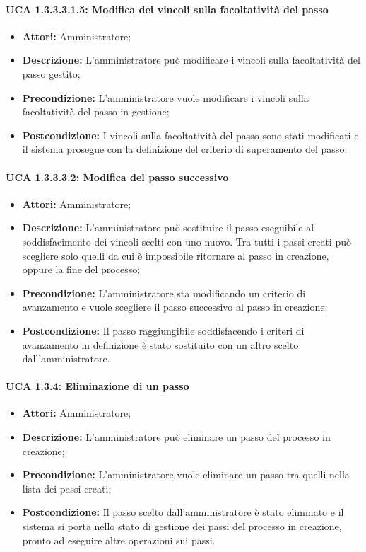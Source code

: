 \paragraph{UCA 1.3.3.3.1.5: Modifica dei vincoli sulla facoltatività del passo}
\begin{itemize}
\item \textbf{Attori:}
 Amministratore;
\item \textbf{Descrizione:} 
L'amministratore può modificare i vincoli sulla facoltatività del passo gestito;
\item \textbf{Precondizione:} 
L'amministratore vuole modificare i vincoli sulla facoltatività del passo in gestione;
\item \textbf{Postcondizione:} 
I vincoli sulla facoltatività del passo sono stati modificati e il sistema prosegue con la definizione del criterio di superamento del passo.
\end{itemize}

\paragraph{UCA 1.3.3.3.2: Modifica del passo successivo}
\begin{itemize}
\item \textbf{Attori:}
 Amministratore;
\item \textbf{Descrizione:}
 L'amministratore può sostituire il passo eseguibile al soddisfacimento dei vincoli scelti con uno nuovo. Tra tutti i passi creati può scegliere solo quelli da cui è impossibile ritornare al passo in creazione, oppure la fine del processo;
\item \textbf{Precondizione:} 
L'amministratore sta modificando un criterio di avanzamento e vuole scegliere il passo successivo al passo in creazione;
\item \textbf{Postcondizione:} 
Il passo raggiungibile soddisfacendo i criteri di avanzamento in definizione è stato sostituito con un altro scelto dall'amministratore.
\end{itemize}

\paragraph{UCA 1.3.4: Eliminazione di un passo}
\begin{itemize}
\item \textbf{Attori:}
 Amministratore;
\item \textbf{Descrizione:} 
L'amministratore può eliminare un passo del processo in creazione; 
\item \textbf{Precondizione:}
 L'amministratore vuole eliminare un passo tra quelli nella lista dei passi creati;
\item \textbf{Postcondizione:} 
Il passo scelto dall'amministratore è stato eliminato e il sistema si porta nello stato di gestione dei passi del processo in creazione, pronto ad eseguire altre operazioni sui passi. 
\end{itemize}

